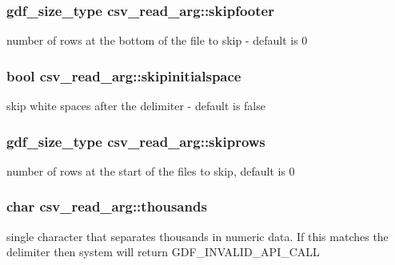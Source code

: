 \subsubsection[{\texorpdfstring{skipfooter}{skipfooter}}]{\setlength{\rightskip}{0pt plus 5cm}gdf\+\_\+size\+\_\+type csv\+\_\+read\+\_\+arg\+::skipfooter}\hypertarget{structcsv__read__arg_a5884681e269f7696cf7cab881056589d}{}\label{structcsv__read__arg_a5884681e269f7696cf7cab881056589d}
number of rows at the bottom of the file to skip -\/ default is 0 
\subsubsection[{\texorpdfstring{skipinitialspace}{skipinitialspace}}]{\setlength{\rightskip}{0pt plus 5cm}bool csv\+\_\+read\+\_\+arg\+::skipinitialspace}\hypertarget{structcsv__read__arg_af45abee5cdab1f0a42def17c9b9cea94}{}\label{structcsv__read__arg_af45abee5cdab1f0a42def17c9b9cea94}
skip white spaces after the delimiter -\/ default is false 
\subsubsection[{\texorpdfstring{skiprows}{skiprows}}]{\setlength{\rightskip}{0pt plus 5cm}gdf\+\_\+size\+\_\+type csv\+\_\+read\+\_\+arg\+::skiprows}\hypertarget{structcsv__read__arg_ac4e846360b19413d1a48f2b816c2692d}{}\label{structcsv__read__arg_ac4e846360b19413d1a48f2b816c2692d}
number of rows at the start of the files to skip, default is 0 
\subsubsection[{\texorpdfstring{thousands}{thousands}}]{\setlength{\rightskip}{0pt plus 5cm}char csv\+\_\+read\+\_\+arg\+::thousands}\hypertarget{structcsv__read__arg_a61219b4c6bf1f023ec0f8126914f3d6f}{}\label{structcsv__read__arg_a61219b4c6bf1f023ec0f8126914f3d6f}
single character that separates thousands in numeric data. If this matches the delimiter then system will return G\+D\+F\+\_\+\+I\+N\+V\+A\+L\+I\+D\+\_\+\+A\+P\+I\+\_\+\+C\+A\+LL 
